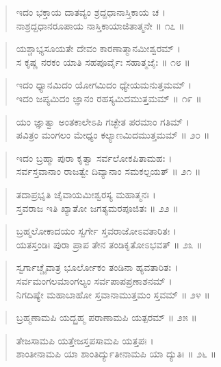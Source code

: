\begin{verse}
ಇದಂ ಭಕ್ತಾಯ ದಾತವ್ಯಂ ಶ್ರದ್ದಧಾನಾಸ್ತಿಕಾಯ ಚ ।\\ನಾಶ್ರದ್ದಧಾನರೂಪಾಯ ನಾಸ್ತಿಕಾಯಾಜಿತಾತ್ಮನೇ \num{॥ ೧೭ ॥}
\end{verse}

\begin{verse}
ಯಶ್ಚಾಭ್ಯಸೂಯತೇ ದೇವಂ ಕಾರಣಾತ್ಮಾನಮೀಶ್ವರಮ್ ।\\ಸ ಕೃಷ್ಣ ನರಕಂ ಯಾತಿ ಸಹಪೂರ್ವೈಃ ಸಹಾತ್ಮಜೈಃ \num{॥ ೧೮ ॥}
\end{verse}

\begin{verse}
ಇದಂ ಧ್ಯಾನಮಿದಂ ಯೋಗಮಿದಂ ಧ್ಯೇಯಮನುತ್ತಮಮ್ ।\\ಇದಂ ಜಪ್ಯಮಿದಂ ಜ್ಞಾನಂ ರಹಸ್ಯಮಿದಮುತ್ತಮಮ್ \num{॥ ೧೯ ॥}
\end{verse}

\begin{verse}
ಯಂ ಜ್ಞಾತ್ವಾ ಅಂತಕಾಲೇಽಪಿ ಗಚ್ಛೇತ ಪರಮಾಂ ಗತಿಮ್ ।\\ಪವಿತ್ರಂ ಮಂಗಲಂ ಮೇಧ್ಯಂ ಕಲ್ಯಾಣಮಿದಮುತ್ತಮಮ್ \num{॥ ೨೦ ॥}
\end{verse}

\begin{verse}
ಇದಂ ಬ್ರಹ್ಮಾ ಪುರಾ ಕೃತ್ವಾ ಸರ್ವಲೋಕಪಿತಾಮಹಃ ।\\ಸರ್ವಸ್ತವಾನಾಂ ರಾಜತ್ವೇ ದಿವ್ಯಾನಾಂ ಸಮಕಲ್ಪಯತ್ \num{॥ ೨೧ ॥}
\end{verse}

\begin{verse}
ತದಾಪ್ರಭೃತಿ ಚೈವಾಯಮೀಶ್ವರಸ್ಯ ಮಹಾತ್ಮನಃ ।\\ಸ್ತವರಾಜ ಇತಿ ಖ್ಯಾತೋ ಜಗತ್ಯಮರಪೂಜಿತಃ \num{॥ ೨೨ ॥}
\end{verse}

\begin{verse}
ಬ್ರಹ್ಮಲೋಕಾದಯಂ ಸ್ವರ್ಗೇ ಸ್ತವರಾಜೋಽವತಾರಿತಃ ।\\ಯತಸ್ತಂಡಿಃ ಪುರಾ ಪ್ರಾಪ ತೇನ ತಂಡಿಕೃತೋಽಭವತ್ \num{॥ ೨೩ ॥}
\end{verse}

\begin{verse}
ಸ್ವರ್ಗಾಚ್ಚೈವಾತ್ರ ಭೂರ್ಲೋಕಂ ತಂಡಿನಾ ಹ್ಯವತಾರಿತಃ ।\\ಸರ್ವಮಂಗಲಮಾಂಗಲ್ಯಂ ಸರ್ವಪಾಪಪ್ರಣಾಶನಮ್ ।\\ನಿಗದಿಷ್ಯೇ ಮಹಾಬಾಹೋ ಸ್ತವಾನಾಮುತ್ತಮಂ ಸ್ತವಮ್ \num{॥ ೨೪ ॥}
\end{verse}

\begin{verse}
ಬ್ರಹ್ಮಣಾಮಪಿ ಯದ್ಬ್ರಹ್ಮ ಪರಾಣಾಮಪಿ ಯತ್ಪರಮ್ \num{॥ ೨೫ ॥}
\end{verse}

\begin{verse}
ತೇಜಸಾಮಪಿ ಯತ್ತೇಜಸ್ತಪಸಾಮಪಿ ಯತ್ತಪಃ ।\\ಶಾಂತೀನಾಮಪಿ ಯಾ ಶಾಂತಿರ್ದ್ಯುತೀನಾಮಪಿ ಯಾ ದ್ಯುತಿಃ \num{॥ ೨೬ ॥}
\end{verse}

